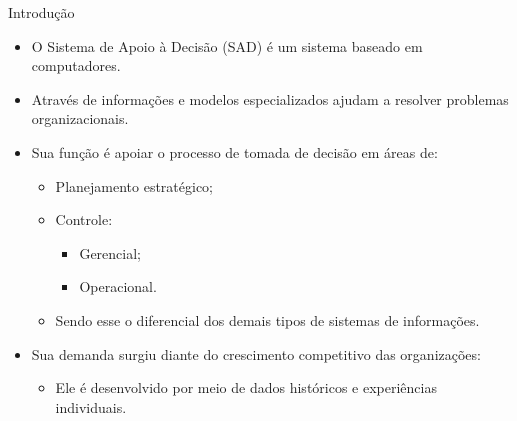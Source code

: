 \begin{frame}[allowframebreaks]{Introdução}
    
    \begin{itemize}
        \item O Sistema de Apoio à Decisão (SAD) é um sistema baseado em computadores.
        \item Através de informações e modelos especializados ajudam a resolver problemas organizacionais.
        \item Sua função é apoiar o processo de tomada de decisão em áreas de:
        \begin{itemize}
            \item Planejamento estratégico;
            \item Controle:
            \begin{itemize}
                \item Gerencial;
                \item Operacional.
            \end{itemize}
            
            \item Sendo esse o diferencial dos demais tipos de sistemas de informações.
        \end{itemize}
    
        \item Sua demanda surgiu diante do crescimento competitivo das organizações:
        \begin{itemize}
            \item Ele é desenvolvido por meio de dados históricos e experiências individuais.
        \end{itemize}
    \end{itemize}
    
\end{frame}
